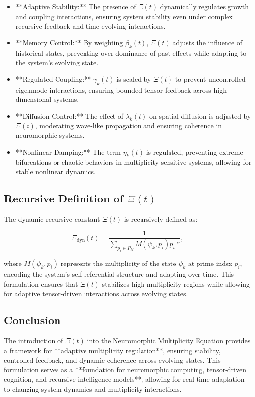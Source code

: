 \documentclass{article}
\theoremstyle{plain}
\begin{document}
\begin{itemize}
    \item **Adaptive Stability:** The presence of \(\Xi(t) \) dynamically regulates growth and coupling interactions, ensuring system stability even under complex recursive feedback and time-evolving interactions.
    \item **Memory Control:** By weighting \( \beta_k(t) \), \(\Xi(t) \) adjusts the influence of historical states, preventing over-dominance of past effects while adapting to the system's evolving state.
    \item **Regulated Coupling:** \( \gamma_k(t) \) is scaled by \(\Xi(t) \) to prevent uncontrolled eigenmode interactions, ensuring bounded tensor feedback across high-dimensional systems.
    \item **Diffusion Control:** The effect of \( \lambda_k(t) \) on spatial diffusion is adjusted by \(\Xi(t) \), moderating wave-like propagation and ensuring coherence in neuromorphic systems.
    \item **Nonlinear Damping:** The term \( \eta_k(t) \) is regulated, preventing extreme bifurcations or chaotic behaviors in multiplicity-sensitive systems, allowing for stable nonlinear dynamics.
\end{itemize}

\subsection{Recursive Definition of \(\Xi(t) \)}

The dynamic recursive constant \(\Xi(t) \) is recursively defined as:

\begin{equation}
\Xi_{\text{dyn}}(t) = \frac{1}{\sum_{p_i \in P_N} M(\psi_k, p_i) p_i^{-\alpha}},
\end{equation}

where \( M(\psi_k, p_i) \) represents the multiplicity of the state \( \psi_k \) at prime index \( p_i \), encoding the system’s self-referential structure and adapting over time. This formulation ensures that \(\Xi(t) \) stabilizes high-multiplicity regions while allowing for adaptive tensor-driven interactions across evolving states.

\subsection{Conclusion}

The introduction of \(\Xi(t) \) into the Neuromorphic Multiplicity Equation provides a framework for **adaptive multiplicity regulation**, ensuring stability, controlled feedback, and dynamic coherence across evolving states. This formulation serves as a **foundation for neuromorphic computing, tensor-driven cognition, and recursive intelligence models**, allowing for real-time adaptation to changing system dynamics and multiplicity interactions.
\end{document}
